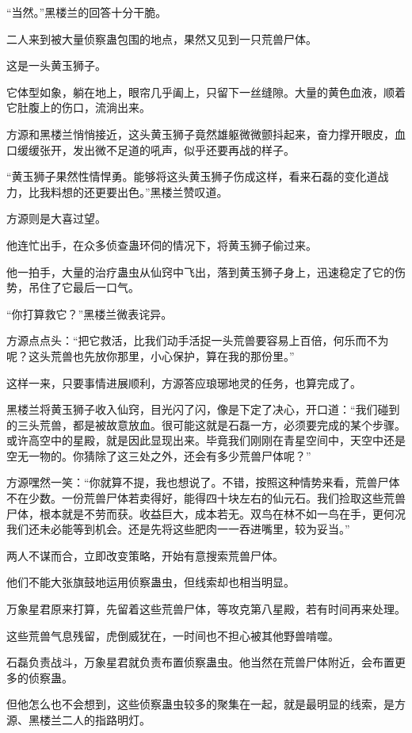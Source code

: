 \begin{this_body}
“当然。”黑楼兰的回答十分干脆。

二人来到被大量侦察蛊包围的地点，果然又见到一只荒兽尸体。

这是一头黄玉狮子。

它体型如象，躺在地上，眼帘几乎阖上，只留下一丝缝隙。大量的黄色血液，顺着它肚腹上的伤口，流淌出来。

方源和黑楼兰悄悄接近，这头黄玉狮子竟然雄躯微微颤抖起来，奋力撑开眼皮，血口缓缓张开，发出微不足道的吼声，似乎还要再战的样子。

“黄玉狮子果然性情悍勇。能够将这头黄玉狮子伤成这样，看来石磊的变化道战力，比我料想的还更要出色。”黑楼兰赞叹道。

方源则是大喜过望。

他连忙出手，在众多侦查蛊环伺的情况下，将黄玉狮子偷过来。

他一拍手，大量的治疗蛊虫从仙窍中飞出，落到黄玉狮子身上，迅速稳定了它的伤势，吊住了它最后一口气。

“你打算救它？”黑楼兰微表诧异。

方源点点头：“把它救活，比我们动手活捉一头荒兽要容易上百倍，何乐而不为呢？这头荒兽也先放你那里，小心保护，算在我的那份里。”

这样一来，只要事情进展顺利，方源答应琅琊地灵的任务，也算完成了。

黑楼兰将黄玉狮子收入仙窍，目光闪了闪，像是下定了决心，开口道：“我们碰到的三头荒兽，都是被故意放血。很可能这就是石磊一方，必须要完成的某个步骤。或许高空中的星殿，就是因此显现出来。毕竟我们刚刚在青星空间中，天空中还是空无一物的。你猜除了这三处之外，还会有多少荒兽尸体呢？”

方源嘿然一笑：“你就算不提，我也想说了。不错，按照这种情势来看，荒兽尸体不在少数。一份荒兽尸体若卖得好，能得四十块左右的仙元石。我们捡取这些荒兽尸体，根本就是不劳而获。收益巨大，成本若无。双鸟在林不如一鸟在手，更何况我们还未必能等到机会。还是先将这些肥肉一一吞进嘴里，较为妥当。”

两人不谋而合，立即改变策略，开始有意搜索荒兽尸体。

他们不能大张旗鼓地运用侦察蛊虫，但线索却也相当明显。

万象星君原来打算，先留着这些荒兽尸体，等攻克第八星殿，若有时间再来处理。

这些荒兽气息残留，虎倒威犹在，一时间也不担心被其他野兽啃噬。

石磊负责战斗，万象星君就负责布置侦察蛊虫。他当然在荒兽尸体附近，会布置更多的侦察蛊。

但他怎么也不会想到，这些侦察蛊虫较多的聚集在一起，就是最明显的线索，是方源、黑楼兰二人的指路明灯。


\end{this_body}
